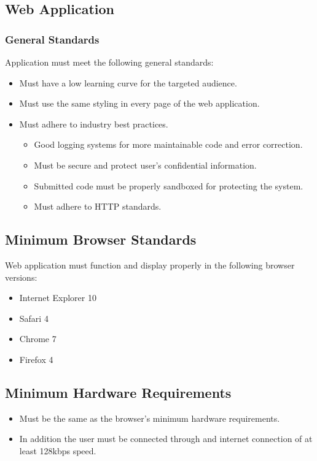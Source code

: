 \label{sec:stand}

\subsection{Web Application}

\subsubsection{General Standards}

Application must meet the following general standards:

\begin{itemize}
\item Must have a low learning curve for the targeted audience.
\item Must use the same styling in every page of the web application.
\item Must adhere to industry best practices.
\begin{itemize}
\item Good logging systems for more maintainable code and error correction.
\item Must be secure and protect user's confidential information.
\item Submitted code must be properly sandboxed for protecting the system.
\item Must adhere to HTTP standards.
\end{itemize}
\end{itemize}

\subsection{Minimum Browser Standards}

Web application must function and display properly in the following browser
versions:
\begin{itemize}
\item Internet Explorer 10
\item Safari 4
\item Chrome 7
\item Firefox 4
\end{itemize}

\subsection{Minimum Hardware Requirements}
\begin{itemize}
\item Must be the same as the browser's minimum hardware requirements.
\item In addition the user must be connected through and internet connection of
at least 128kbps speed.
\end{itemize}
